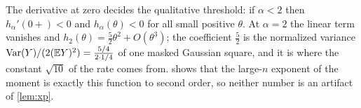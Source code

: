 The derivative at zero decides the qualitative threshold: if $\alpha<2$ then $h_\alpha'(0+)<0$ and $h_\alpha(\theta)<0$ for all small positive $\theta$. At $\alpha=2$ the linear term vanishes and $h_2(\theta)=\tfrac52\theta^2+O(\theta^3)$; the coefficient $\tfrac52$ is the normalized variance $\operatorname{Var}(Y)/(2(\mathbb{E} Y)^2)=\tfrac{5/4}{2\cdot 1/4}$ of one masked Gaussian square, and it is where the constant $\sqrt{10}$ of the rate comes from.  shows that the large-$n$ exponent of the moment is exactly this function to second order, so neither number is an artifact of \cref{lem:xp}.
